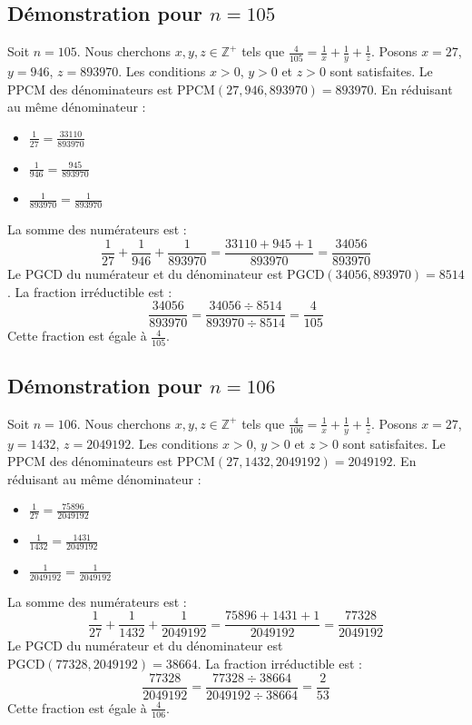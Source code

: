 \documentclass[11pt,a4paper]{article}
\begin{document}
\subsection{Démonstration pour $n = 105$}
Soit $n = 105$. Nous cherchons $x, y, z \in \mathbb{Z}^{+}$ tels que $\frac{4}{105} = \frac{1}{x} + \frac{1}{y} + \frac{1}{z}$.
Posons $x = 27$, $y = 946$, $z = 893970$.
Les conditions $x > 0$, $y > 0$ et $z > 0$ sont satisfaites.
Le PPCM des dénominateurs est $\text{PPCM}(27, 946, 893970) = 893970$.
En réduisant au même dénominateur :
\begin{itemize}
    \item $\frac{1}{27} = \frac{33110}{893970}$
    \item $\frac{1}{946} = \frac{945}{893970}$
    \item $\frac{1}{893970} = \frac{1}{893970}$
\end{itemize}
La somme des numérateurs est :
$$ \frac{1}{27} + \frac{1}{946} + \frac{1}{893970} = \frac{33110 + 945 + 1}{893970} = \frac{34056}{893970} $$
Le PGCD du numérateur et du dénominateur est $\text{PGCD}(34056, 893970) = 8514$.
La fraction irréductible est :
$$ \frac{34056}{893970} = \frac{34056 \div 8514}{893970 \div 8514} = \frac{4}{105} $$
Cette fraction est égale à $\frac{4}{105}$.

\subsection{Démonstration pour $n = 106$}
Soit $n = 106$. Nous cherchons $x, y, z \in \mathbb{Z}^{+}$ tels que $\frac{4}{106} = \frac{1}{x} + \frac{1}{y} + \frac{1}{z}$.
Posons $x = 27$, $y = 1432$, $z = 2049192$.
Les conditions $x > 0$, $y > 0$ et $z > 0$ sont satisfaites.
Le PPCM des dénominateurs est $\text{PPCM}(27, 1432, 2049192) = 2049192$.
En réduisant au même dénominateur :
\begin{itemize}
    \item $\frac{1}{27} = \frac{75896}{2049192}$
    \item $\frac{1}{1432} = \frac{1431}{2049192}$
    \item $\frac{1}{2049192} = \frac{1}{2049192}$
\end{itemize}
La somme des numérateurs est :
$$ \frac{1}{27} + \frac{1}{1432} + \frac{1}{2049192} = \frac{75896 + 1431 + 1}{2049192} = \frac{77328}{2049192} $$
Le PGCD du numérateur et du dénominateur est $\text{PGCD}(77328, 2049192) = 38664$.
La fraction irréductible est :
$$ \frac{77328}{2049192} = \frac{77328 \div 38664}{2049192 \div 38664} = \frac{2}{53} $$
Cette fraction est égale à $\frac{4}{106}$.
\end{document}
